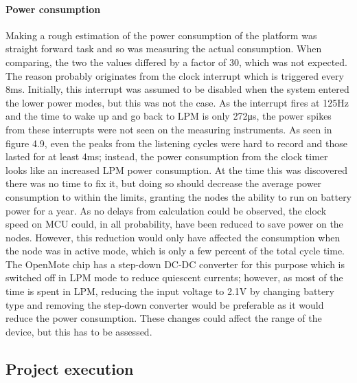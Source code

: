 \paragraph{Power consumption}
Making a rough estimation of the power consumption of the platform was straight forward task and so was measuring the actual consumption.
When comparing,
	the two the values differed by a factor of 30,
	which was not expected.
The reason probably originates from the clock interrupt which is triggered every 8ms.
Initially,
	this interrupt was assumed to be disabled when the system entered the lower power modes,
	but this was not the case.
As the interrupt fires at 125Hz and the time to wake up and go back to LPM is only 272μs,
	the power spikes from these interrupts were not seen on the measuring instruments.
As seen in figure 4.9,
	even the peaks from the listening cycles were hard to record and those lasted for at least 4ms;
	instead,
	the power consumption from the clock timer looks like an increased LPM power consumption.
At the time this was discovered there was no time to fix it,
	but doing so should decrease the average power consumption to within the limits,
	granting the nodes the ability to run on battery power for a year.
As no delays from calculation could be observed,
	the clock speed on MCU could,
	in all probability,
	have been reduced to save power on the nodes.
However,
	this reduction would only have affected the consumption when the node was in active mode,
	which is only a few percent of the total cycle time.
The OpenMote chip has a step-down DC-DC converter for this purpose which is switched off in LPM mode to reduce quiescent currents;
	however,
	as most of the time is spent in LPM,
	reducing the input voltage to 2.1V by changing battery type and removing the step-down converter would be preferable as it would reduce the power consumption.
These changes could affect the range of the device,
	but this has to be assessed.

\subsection{Project execution}

